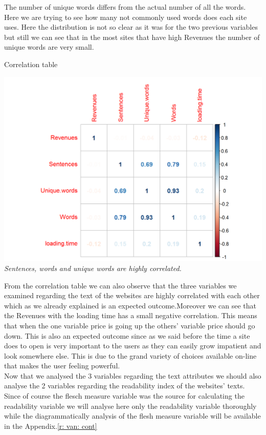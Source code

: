 \documentclass{article}
\begin{document}
The number of unique words differs from the actual number of all the words. Here we are trying to see how many not commonly used words does each site uses. Here the distribution is not so clear as it was for the two previous variables but still we can see that in the most sites that have high Revenues the number of unique words are very small. 
\begin{table}[H]
\centering
\caption{Correlation table}
\begin{center}
\includegraphics[scale=0.5]{../R/photos/38_words_corr.png}    \\
\textit{Sentences, words and unique words are highly correlated.}
\end{center}
\end{table}
From the correlation table we can also observe that the three variables we examined regarding the text of the websites are highly correlated with each other which as we already explained is an expected outcome.Moreover we can see that the Revenues with the loading time has a small negative correlation. This means that when the one variable price is going up the others' variable price should go down. This is also an expected outcome since as we said before the time a site does to open is very important to the users as they can easily grow impatient and look somewhere else. This is due to the grand variety of choices available on-line that makes the user feeling powerful.\\
Now that we analysed the 3 variables regarding the text attributes we should also analyse the 2 variables regarding the readability index of the websites' texts. Since of course the flesch measure variable was the source for calculating the readability variable we will analyse here only the readability variable thoroughly while the diagrammatically analysis of the flesh measure variable will be available in the Appendix.\ref{r: van: cont}
\end{document}
